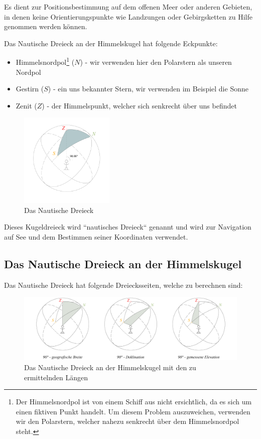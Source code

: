 \begin{refsection}
Es dient zur Positionsbestimmung auf dem offenen Meer oder anderen Gebieten, in denen keine Orientierungspunkte wie Landzungen oder Gebirgsketten zu Hilfe genommen werden können.

Das Nautische Dreieck an der Himmelskugel hat folgende Eckpunkte:
\begin{itemize}
\item Himmelsnordpol\footnote{%
Der Himmelsnordpol ist von einem Schiff aus nicht ersichtlich, da es sich um einen fiktiven Punkt handelt. Um diesem Problem auszuweichen, verwenden wir den Polarstern, welcher nahezu senkrecht über dem Himmelsnordpol steht.}
 ($N$) - wir verwenden hier den Polarstern als unseren Nordpol
\item Gestirn ($S$) - ein uns bekannter Stern, wir verwenden im Beispiel die Sonne
\item Zenit ($Z$) - der Himmelspunkt, welcher sich senkrecht über uns befindet
\end{itemize}

\begin{figure}[htbp]
\centering
\includegraphics[width=0.4\textwidth]{kugel/NautischesDreieck.jpg}
\caption{Das Nautische Dreieck}
\end{figure}

Dieses Kugeldreieck wird “nautisches Dreieck“ genannt und wird zur Navigation auf See und dem Bestimmen seiner Koordinaten verwendet.

\subsection{Das Nautische Dreieck an der Himmelskugel}

Das Nautische Dreieck hat folgende Dreiecksseiten, welche zu berechnen sind:

\begin{figure}[htbp]
\centering
\includegraphics[width=1\textwidth]{kugel/Bestimmung.jpg}
\caption{Das Nautische Dreieck an der Himmelskugel mit den zu ermittelnden Längen}
\end{figure}


\end{refsection}
